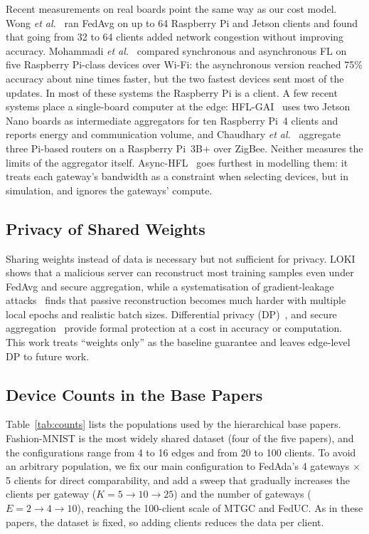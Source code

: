 \documentclass[conference]{IEEEtran}
\begin{document}
Recent measurements on real boards point the same way as our cost model. Wong \textit{et al.}~\cite{wong2026empirical} ran FedAvg on up to 64 Raspberry Pi and Jetson clients and found that going from 32 to 64 clients added network congestion without improving accuracy. Mohammadi \textit{et al.}~\cite{mohammadi2025async} compared synchronous and asynchronous FL on five Raspberry Pi-class devices over Wi-Fi: the asynchronous version reached 75\% accuracy about nine times faster, but the two fastest devices sent most of the updates. In most of these systems the Raspberry Pi is a client. A few recent systems place a single-board computer at the edge: HFL-GAI~\cite{ramalingam2026hflgai} uses two Jetson Nano boards as intermediate aggregators for ten Raspberry Pi~4 clients and reports energy and communication volume, and Chaudhary \textit{et al.}~\cite{chaudhary2025innetwork} aggregate three Pi-based routers on a Raspberry Pi~3B+ over ZigBee. Neither measures the limits of the aggregator itself. Async-HFL~\cite{yu2023asynchfl} goes furthest in modelling them: it treats each gateway's bandwidth as a constraint when selecting devices, but in simulation, and ignores the gateways' compute.

\subsection{Privacy of Shared Weights}
Sharing weights instead of data is necessary but not sufficient for privacy. LOKI~\cite{zhao2024loki} shows that a malicious server can reconstruct most training samples even under FedAvg and secure aggregation, while a systematisation of gradient-leakage attacks~\cite{du2025sok} finds that passive reconstruction becomes much harder with multiple local epochs and realistic batch sizes. Differential privacy (DP)~\cite{abadi2016}, \cite{mcmahan2018dp} and secure aggregation~\cite{bonawitz2017} provide formal protection at a cost in accuracy or computation. This work treats ``weights only'' as the baseline guarantee and leaves edge-level DP to future work.

\subsection{Device Counts in the Base Papers}
Table~\ref{tab:counts} lists the populations used by the hierarchical base papers. Fashion-MNIST is the most widely shared dataset (four of the five papers), and the configurations range from 4 to 16 edges and from 20 to 100 clients. To avoid an arbitrary population, we fix our main configuration to FedAda's 4 gateways $\times$ 5 clients for direct comparability, and add a sweep that gradually increases the clients per gateway ($K = 5 \rightarrow 10 \rightarrow 25$) and the number of gateways ($E = 2 \rightarrow 4 \rightarrow 10$), reaching the 100-client scale of MTGC and FedUC. As in these papers, the dataset is fixed, so adding clients reduces the data per client.
\end{document}
